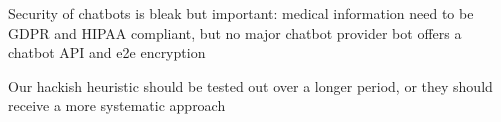 Security of chatbots is bleak but important: medical information need to be GDPR and HIPAA compliant, but no major chatbot provider bot offers a chatbot API and e2e encryption \cite{Alesanco2018}



Our hackish heuristic should be tested out over a longer period, or they should receive a more systematic approach


